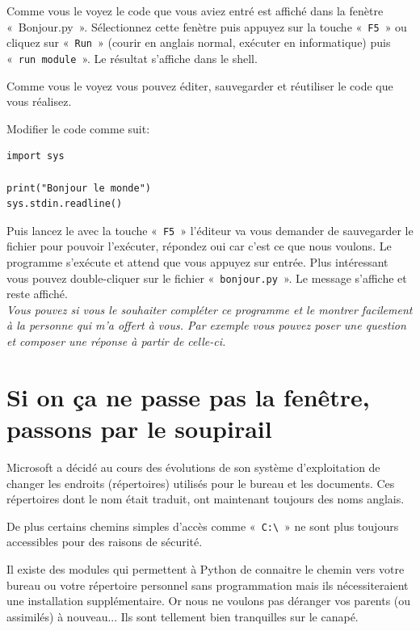Comme vous le voyez le code que vous aviez entré est affiché dans la fenètre «~Bonjour.py~». Sélectionnez cette fenètre puis appuyez sur la touche «~\texttt{F5}~» ou cliquez sur «~\texttt{Run}~» (courir en anglais normal, exécuter en informatique) puis «~\texttt{run module}~». Le résultat s'affiche dans le shell.

Comme vous le voyez vous pouvez éditer, sauvegarder et réutiliser le code que vous réalisez.

Modifier le code comme suit: 

\begin{Verbatim}[frame=single,rulecolor=\color{mbleu}, label=à taper]
import sys

print("Bonjour le monde")
sys.stdin.readline()
\end{Verbatim}

Puis lancez le avec la touche «~\texttt{F5}~» l'éditeur va vous demander de sauvegarder le fichier pour pouvoir l'exécuter, répondez oui car c'est ce que nous voulons. Le programme s'exécute et attend que vous appuyez sur entrée. Plus intéressant vous pouvez double-cliquer sur le fichier «~\texttt{bonjour.py}~». Le message s'affiche et reste affiché. \\

\emph{Vous pouvez si vous le souhaiter compléter ce programme et le montrer facilement à la personne qui m'a offert à vous. Par exemple vous pouvez poser une question et composer une réponse à partir de celle-ci.}\\

\section{Si on ça ne passe pas la fenêtre, passons par le soupirail}
Microsoft a décidé au cours des évolutions de son système d'exploitation de changer les endroits (répertoires) utilisés pour le bureau et les documents. Ces répertoires dont le nom était traduit, ont maintenant toujours des noms anglais.

De plus certains chemins simples d'accès comme «~\Verb+C:\+~» ne sont plus toujours accessibles pour des raisons de sécurité.

Il existe des modules qui permettent à Python de connaitre le chemin vers votre bureau ou votre répertoire personnel sans programmation mais ils nécessiteraient une installation supplémentaire. Or nous ne voulons pas déranger vos parents (ou assimilés) à nouveau... Ils sont tellement bien tranquilles sur le canapé.

